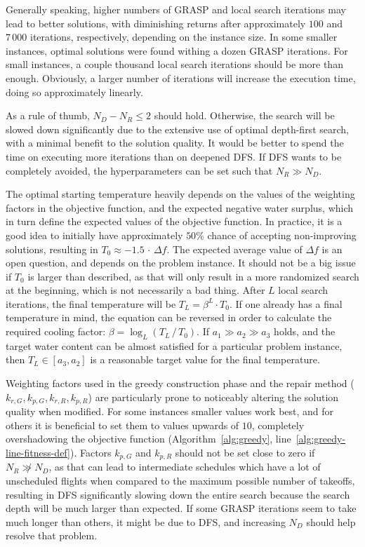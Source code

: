 Generally speaking, higher numbers of GRASP and local search iterations may lead to better solutions, with diminishing returns after approximately $100$ and $7\,000$ iterations, respectively, depending on the instance size.
In some smaller instances, optimal solutions were found withing a dozen GRASP iterations.
For small instances, a couple thousand local search iterations should be more than enough.
Obviously, a larger number of iterations will increase the execution time, doing so approximately linearly.

As a rule of thumb, $N_D - N_R \le 2$ should hold.
Otherwise, the search will be slowed down significantly due to the extensive use of optimal depth-first search, with a minimal benefit to the solution quality.
It would be better to spend the time on executing more iterations than on deepened DFS.
If DFS wants to be completely avoided, the hyperparameters can be set such that $N_R \gg N_D$.

The optimal starting temperature heavily depends on the values of the weighting factors in the objective function, and the expected negative water surplus, which in turn define the expected values of the objective function.
In practice, it is a good idea to initially have approximately $50\%$ chance of accepting non-improving solutions, resulting in $T_0 \approx -1.5 \, \cdot \, \Delta f$.
The expected average value of $\Delta f$ is an open question, and depends on the problem instance.
It should not be a big issue if $T_0$ is larger than described, as that will only result in a more randomized search at the beginning, which is not necessarily a bad thing.
After $L$ local search iterations, the final temperature will be $T_L = \beta ^ L \cdot T_0$.
If one already has a final temperature in mind, the equation can be reversed in order to calculate the required cooling factor: $\beta = \log_L \left( T_L \, / \, T_0 \right)$.
If $a_1 \gg a_2 \gg a_3$ holds, and the target water content can be almost satisfied for a particular problem instance, then $T_L \in [ a_3, a_2 ]$ is a reasonable target value for the final temperature.

Weighting factors used in the greedy construction phase and the repair method ($k_{r, G}, k_{p, G}, k_{r, R}, k_{p, R}$) are particularly prone to noticeably altering the solution quality when modified.
For some instances smaller values work best, and for others it is beneficial to set them to values upwards of $10$, completely overshadowing the objective function (Algorithm~\ref{alg:greedy}, line~\ref{alg:greedy-line-fitness-def}).
Factors $k_{p, G}$ and $k_{p, R}$ should not be set close to zero if $N_R \not\gg N_D$, as that can lead to intermediate schedules which have a lot of unscheduled flights when compared to the maximum possible number of takeoffs, resulting in DFS significantly slowing down the entire search because the search depth will be much larger than expected.
If some GRASP iterations seem to take much longer than others, it might be due to DFS, and increasing $N_D$ should help resolve that problem.

